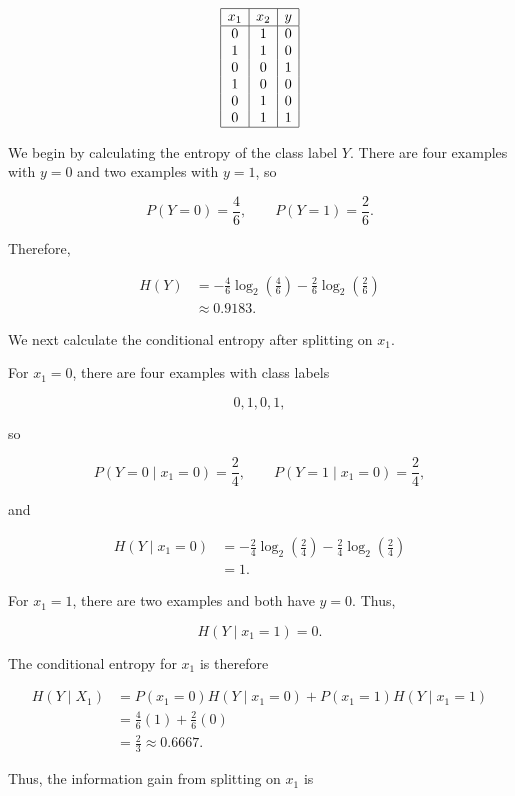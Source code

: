\documentclass[12pt]{article}
\begin{document}
\begin{enumerate}
\[
\begin{array}{|c|c|c|}
\hline
x_1 & x_2 & y \\
\hline
0 & 1 & 0 \\
1 & 1 & 0 \\
0 & 0 & 1 \\
1 & 0 & 0 \\
0 & 1 & 0 \\
0 & 1 & 1 \\
\hline
\end{array}
\]

We begin by calculating the entropy of the class label $Y$. There are four examples with $y=0$ and two examples with $y=1$, so

\[
P(Y=0)=\frac{4}{6},
\qquad
P(Y=1)=\frac{2}{6}.
\]

Therefore,

\[
\begin{aligned}
H(Y)
&=
-\frac{4}{6}\log_2\left(\frac{4}{6}\right)
-\frac{2}{6}\log_2\left(\frac{2}{6}\right) \\
&\approx 0.9183.
\end{aligned}
\]

We next calculate the conditional entropy after splitting on $x_1$.

For $x_1=0$, there are four examples with class labels

\[
0,1,0,1,
\]

so

\[
P(Y=0\mid x_1=0)=\frac{2}{4},
\qquad
P(Y=1\mid x_1=0)=\frac{2}{4},
\]

and

\[
\begin{aligned}
H(Y\mid x_1=0)
&=
-\frac{2}{4}\log_2\left(\frac{2}{4}\right)
-\frac{2}{4}\log_2\left(\frac{2}{4}\right) \\
&=1.
\end{aligned}
\]

For $x_1=1$, there are two examples and both have $y=0$. Thus,

\[
H(Y\mid x_1=1)=0.
\]

The conditional entropy for $x_1$ is therefore

\[
\begin{aligned}
H(Y\mid X_1)
&=
P(x_1=0)H(Y\mid x_1=0)
+
P(x_1=1)H(Y\mid x_1=1) \\
&=
\frac{4}{6}(1)+\frac{2}{6}(0) \\
&=
\frac{2}{3}
\approx 0.6667.
\end{aligned}
\]

Thus, the information gain from splitting on $x_1$ is


\end{enumerate}
\end{document}
